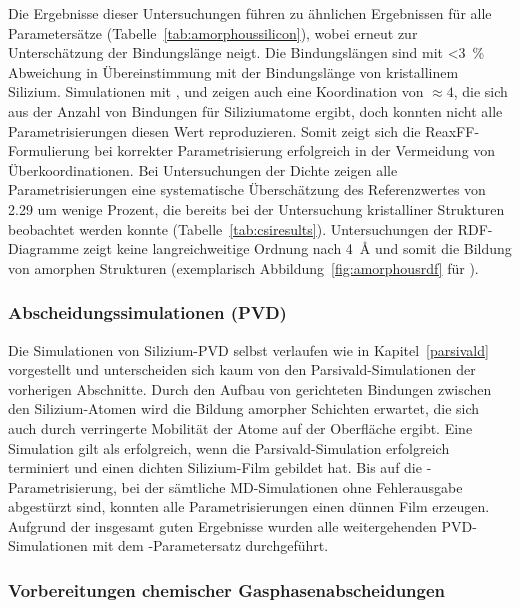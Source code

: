 Die Ergebnisse dieser Untersuchungen führen zu ähnlichen Ergebnissen für alle Parametersätze (Tabelle~\ref{tab:amorphoussilicon}), wobei  erneut zur Unterschätzung der Bindungslänge neigt.
Die Bindungslängen sind mit \SI{<3}{\percent} Abweichung in Übereinstimmung mit der Bindungslänge von kristallinem Silizium.
Simulationen mit ,  und  zeigen auch eine Koordination von $\approx\num{4}$, die sich aus der Anzahl von Bindungen für Siliziumatome ergibt, doch konnten nicht alle Parametrisierungen diesen Wert reproduzieren.
Somit zeigt sich die ReaxFF-Formulierung bei korrekter Parametrisierung erfolgreich in der Vermeidung von Überkoordinationen.
Bei Untersuchungen der Dichte zeigen alle Parametrisierungen eine systematische Überschätzung des Referenzwertes von \SI{2.29}{\gpcc}\cite{remes_optical_1998} um wenige Prozent, die bereits bei der Untersuchung kristalliner Strukturen beobachtet werden konnte (Tabelle~\ref{tab:csiresults}).
Untersuchungen der RDF-Diagramme zeigt keine langreichweitige Ordnung nach \SI{4}{\angstrom} und somit die Bildung von amorphen Strukturen (exemplarisch Abbildung~\ref{fig:amorphousrdf} für ).

\subsubsection{Abscheidungssimulationen (PVD)}

Die Simulationen von Silizium-PVD selbst verlaufen wie in Kapitel~\ref{parsivald} vorgestellt und unterscheiden sich kaum von den Parsivald-Simulationen der vorherigen Abschnitte.
Durch den Aufbau von gerichteten Bindungen zwischen den Silizium-Atomen wird die Bildung amorpher Schichten erwartet, die sich auch durch verringerte Mobilität der Atome auf der Oberfläche ergibt.
Eine Simulation gilt als erfolgreich, wenn die Parsivald-Simulation erfolgreich terminiert und einen dichten Silizium-Film gebildet hat.
Bis auf die -Parametrisierung, bei der sämtliche MD-Simulationen ohne Fehlerausgabe abgestürzt sind, konnten alle Parametrisierungen einen dünnen Film erzeugen.
Aufgrund der insgesamt guten Ergebnisse wurden alle weitergehenden PVD-Simulationen mit dem -Parametersatz durchgeführt.

\subsubsection{Vorbereitungen chemischer Gasphasenabscheidungen}

